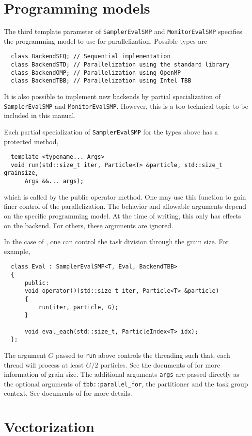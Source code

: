 \section{Programming models}
\label{sec:Programming models}

The third template parameter of \verb|SamplerEvalSMP| and \verb|MonitorEvalSMP|
specifies the programming model to use for parallelization. Possible types are
\begin{Verbatim}
  class BackendSEQ; // Sequential implementation
  class BackendSTD; // Parallelization using the standard library
  class BackendOMP; // Parallelization using OpenMP
  class BackendTBB; // Parallelization using Intel TBB
\end{Verbatim}
It is also possible to implement new backends by partial specialization of
\verb|SamplerEvalSMP| and \verb|MonitorEvalSMP|. However, this is a too
technical topic to be included in this manual.

Each partial specialization of \verb|SamplerEvalSMP| for the types above has a
protected method,
\begin{Verbatim}
  template <typename... Args>
  void run(std::size_t iter, Particle<T> &particle, std::size_t grainsize,
      Args &&... args);
\end{Verbatim}
which is called by the public operator method. One may use this function to
gain finer control of the parallelization. The behavior and allowable arguments
depend on the specific programming model. At the time of writing, this only has
effects on the \tbb backend. For others, these arguments are ignored.

In the case of \tbb, one can control the task division through the grain size.
For example,
\begin{Verbatim}
  class Eval : SamplerEvalSMP<T, Eval, BackendTBB>
  {
      public:
      void operator()(std::size_t iter, Particle<T> &particle)
      {
          run(iter, particle, G);
      }

      void eval_each(std::size_t, ParticleIndex<T> idx);
  };
\end{Verbatim}
The argument $G$ passed to \verb|run| above controls the threading such that,
each thread will process at least $G / 2$ particles. See the documents of \tbb
for more information of grain size. The additional arguments \verb|args| are
passed directly as the optional arguments of \verb|tbb::parallel_for|, the
partitioner and the task group context. See documents of \tbb for more details.

\section{Vectorization}
\label{sec:Vectorization}

